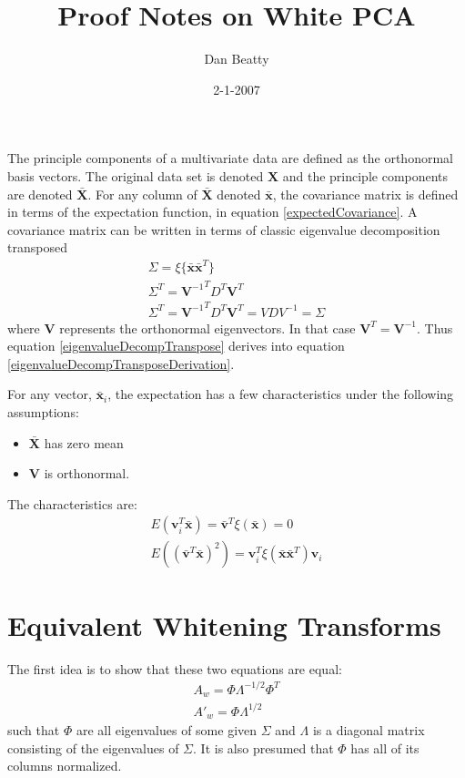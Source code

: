 \documentclass[11pt]{article}
\title{Proof Notes on White PCA}
\author{Dan Beatty}
\date{2-1-2007}                           %
\begin{document}
\maketitle
The principle components of a multivariate data are defined as the orthonormal basis vectors.  The original data set is denoted $\mathbf{X}$ and the principle components are denoted $\mathbf{\bar{X}}$.
For any column of $\mathbf{\bar{X}}$ denoted $\mathbf{\bar{x}}$, the covariance matrix is defined in terms of the expectation function, in equation \ref{expectedCovariance}.  
A covariance matrix can be written in terms of classic eigenvalue decomposition transposed
\begin{eqnarray*}
	\Sigma = \xi \{ \mathbf{\bar{x}} \mathbf{\bar{x}}^T \} \label{expectedCovariance} \\
	\Sigma^T = {\mathbf{V}^{-1}}^T D^T \mathbf{V}^T \label{eigenvalueDecompTranspose} \\
	\Sigma^T = {\mathbf{V}^{-1}}^T D^T \mathbf{V}^T = V D V^{-1} =\Sigma  \label{eigenvalueDecompTransposeDerivation}
\end{eqnarray*}
where $\mathbf{V}$ represents the orthonormal eigenvectors.  In that case $\mathbf{V}^T = \mathbf{V}^{-1}$.  Thus equation \ref{eigenvalueDecompTranspose} derives into equation \ref{eigenvalueDecompTransposeDerivation}.


For any vector, $\mathbf{\bar{x}}_i$, the expectation has a few characteristics under the following assumptions:
\begin{itemize}
	\item $\mathbf{\bar{X}}$ has zero mean
	\item $\mathbf{V}$ is orthonormal.  
\end{itemize}
The characteristics are:
\begin{eqnarray}
	E(\mathbf{v}_i ^T \mathbf{\bar{x}}) = \mathbf{\bar{v}}^T \xi(\mathbf{\bar{x}} ) = 0 \\
	E((\mathbf{\bar{v}}^T \mathbf{\bar{x}})^2) = \mathbf{v}_i ^T \xi (\mathbf{\bar{x}} \mathbf{\bar{x}}^T) \mathbf{v}_i 
\end{eqnarray}

\section{Equivalent Whitening Transforms}
The first idea is to show that these two equations are equal:
\begin{eqnarray}
	A_w = \Phi \Lambda^{-1/2} \Phi^T \\
	A'_w = \Phi  \Lambda^{1/2} 
\end{eqnarray}
such that $\Phi
$ are all eigenvalues of some given $\Sigma$ and $\Lambda$ is a diagonal matrix consisting of the eigenvalues of $\Sigma$.  It is also presumed that $\Phi$ has all of its columns normalized.  
\end{document}
